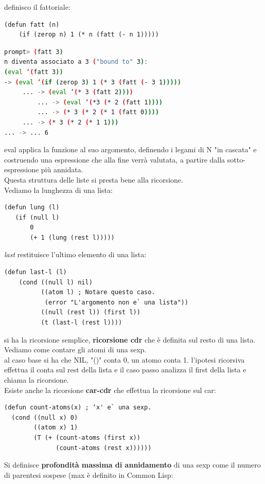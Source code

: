 \documentclass[a4paper,12pt, oneside]{book}
\begin{document}
\newpage
definisco il fattoriale:
\begin{verbatim}
(defun fatt (n)
    (if (zerop n) 1 (* n (fatt (- n 1)))))
\end{verbatim}
\begin{shaded}
\begin{lstlisting}[language=bash]
prompt> (fatt 3)
n diventa associato a 3 ("bound to" 3):
(eval ‘(fatt 3))
-> (eval ‘(if (zerop 3) 1 (* 3 (fatt (- 3 1)))))
     ... -> (eval ‘(* 3 (fatt 2))))
         ... -> (eval ‘(*3 (* 2 (fatt 1))))
         ... -> (* 3 (* 2 (* 1 (fatt 0))))
     ... -> (* 3 (* 2 (* 1 1)))
... -> ... 6
\end{lstlisting}
\end{shaded}
eval applica la funzione al suo argomento, definendo i legami di N "in cascata" e
costruendo una espressione che alla fine verrà valutata, a partire dalla sotto-espressione
più annidata.\\ Questa struttura delle liste si presta bene alla ricorsione. \\
Vediamo la lunghezza di una lista:
\begin{verbatim}
(defun lung (l)
   (if (null l)
       0
       (+ 1 (lung (rest l)))))
\end{verbatim}
\textit{last} restituisce l'ultimo elemento di una lista:
\begin{verbatim}
(defun last-l (l)
    (cond ((null l) nil)
          ((atom l) ; Notare questo caso.
           (error "L'argomento non e` una lista"))
          ((null (rest l)) (first l))
          (t (last-l (rest l))))
\end{verbatim}
si ha la ricorsione semplice, \textbf{ricorsione cdr} che è definita sul resto di una lista.\\
Vediamo come contare gli atomi di una sexp.\\
al caso base si ha che NIL, "()" conta 0, un atomo conta 1. l'ipotesi ricorsiva effettua il conta sul rest della lista e il caso passo analizza il first della lista e chiama la ricorsione.
\\
Esiste anche la ricorsione \textbf{car-cdr} che effettua la ricorsione sul car:
\begin{verbatim}
(defun count-atoms(x) ; ‘x' e` una sexp.
  (cond ((null x) 0)
        ((atom x) 1)
        (T (+ (count-atoms (first x))
              (count-atoms (rest x))))))
\end{verbatim}
Si definisce \textbf{profondità massima di annidamento} di una sexp come il numero di parentesi sospese (max è definito in Common Lisp:
\end{document}
